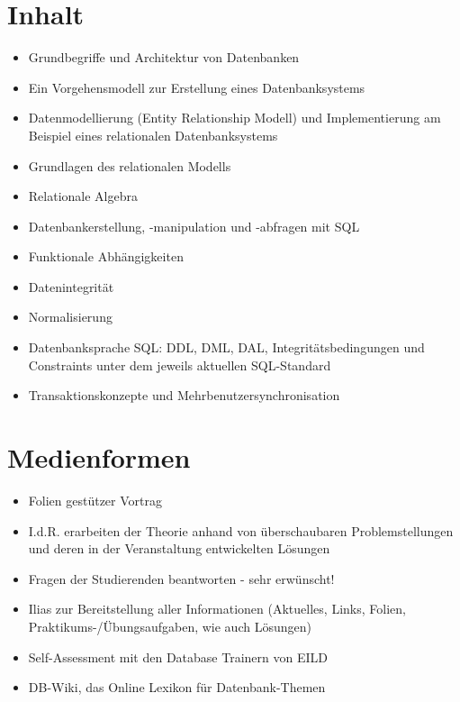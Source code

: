 \hypertarget{inhaltpathlabel....srcmodulbeschreibungen-bachelor-bpo5ba_datenbanksysteme}{%
\section*{Inhalt\label{../../src/modulbeschreibungen-bachelor-bpo5/BA_Datenbanksysteme}}\label{inhaltpathlabel....srcmodulbeschreibungen-bachelor-bpo5ba_datenbanksysteme}}

\begin{itemize}
\tightlist
\item
  Grundbegriffe und Architektur von Datenbanken
\item
  Ein Vorgehensmodell zur Erstellung eines Datenbanksystems
\item
  Datenmodellierung (Entity Relationship Modell) und Implementierung am
  Beispiel eines relationalen Datenbanksystems
\item
  Grundlagen des relationalen Modells
\item
  Relationale Algebra
\item
  Datenbankerstellung, -manipulation und -abfragen mit SQL
\item
  Funktionale Abhängigkeiten
\item
  Datenintegrität
\item
  Normalisierung
\item
  Datenbanksprache SQL: DDL, DML, DAL, Integritätsbedingungen und
  Constraints unter dem jeweils aktuellen SQL-Standard
\item
  Transaktionskonzepte und Mehrbenutzersynchronisation
\end{itemize}

\hypertarget{medienformenpathlabel....srcmodulbeschreibungen-bachelor-bpo5ba_datenbanksysteme}{%
\section*{Medienformen\label{../../src/modulbeschreibungen-bachelor-bpo5/BA_Datenbanksysteme}}\label{medienformenpathlabel....srcmodulbeschreibungen-bachelor-bpo5ba_datenbanksysteme}}

\begin{itemize}
\tightlist
\item
  Folien gestützer Vortrag
\item
  I.d.R. erarbeiten der Theorie anhand von überschaubaren
  Problemstellungen und deren in der Veranstaltung entwickelten Lösungen
\item
  Fragen der Studierenden beantworten - sehr erwünscht!
\item
  Ilias zur Bereitstellung aller Informationen (Aktuelles, Links,
  Folien, Praktikums-/Übungsaufgaben, wie auch Lösungen)
\item
  Self-Assessment mit den Database Trainern von EILD
\item
  DB-Wiki, das Online Lexikon für Datenbank-Themen
\end{itemize}


